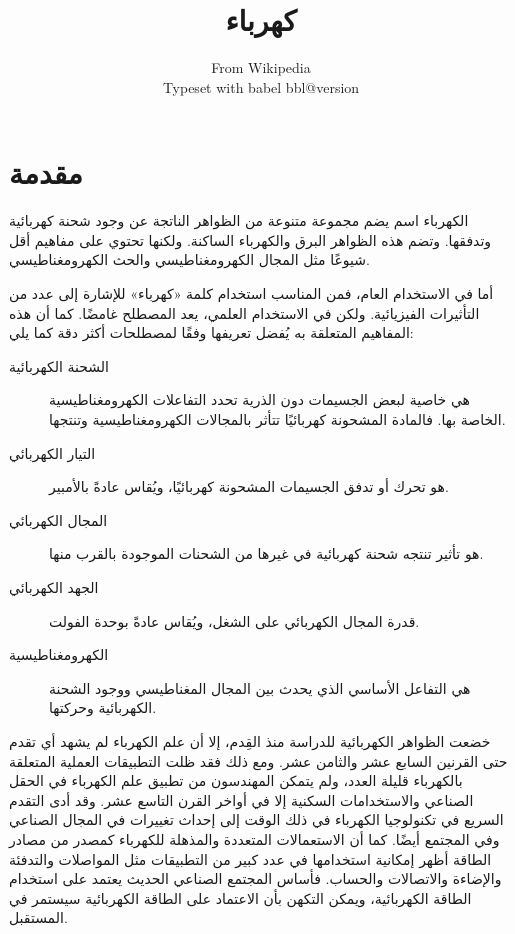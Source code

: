 \documentclass[a4paper]{book}
\title{كهرباء}
\author{\foreignlanguage{english}{From Wikipedia}\\%
        \foreignlanguage{english}{%
          Typeset with \textsf{babel} \csname bbl@version\endcsname}}
\begin{document}
\frontmatter

\maketitle

\tableofcontents

\chapter{مقدمة}

الكهرباء اسم يضم مجموعة متنوعة من الظواهر الناتجة عن وجود شحنة
كهربائية وتدفقها. وتضم هذه الظواهر البرق والكهرباء الساكنة. ولكنها
تحتوي على مفاهيم أقل شيوعًا مثل المجال الكهرومغناطيسي والحث
الكهرومغناطيسي.

أما في الاستخدام العام، فمن المناسب استخدام كلمة «كهرباء» للإشارة إلى
عدد من التأثيرات الفيزيائية. ولكن في الاستخدام العلمي، يعد المصطلح
غامضًا. كما أن هذه المفاهيم المتعلقة به يُفضل تعريفها وفقًا لمصطلحات أكثر
دقة كما يلي:

\begin{description}
\item[الشحنة الكهربائية] هي خاصية لبعض الجسيمات دون الذرية تحدد
التفاعلات الكهرومغناطيسية الخاصة بها. فالمادة المشحونة كهربائيًا تتأثر
بالمجالات الكهرومغناطيسية وتنتجها.
\item[التيار الكهربائي] هو تحرك أو تدفق الجسيمات المشحونة كهربائيًا،
ويُقاس عادةً بالأمبير.
\item[المجال الكهربائي] هو تأثير تنتجه شحنة كهربائية في غيرها من
الشحنات الموجودة بالقرب منها.
\item[الجهد الكهربائي] قدرة المجال الكهربائي على الشغل، ويُقاس عادةً
بوحدة الفولت.
\item[الكهرومغناطيسية] هي التفاعل الأساسي الذي يحدث بين المجال
المغناطيسي ووجود الشحنة الكهربائية وحركتها.
\end{description}

خضعت الظواهر الكهربائية للدراسة منذ القِدم، إلا أن علم الكهرباء لم يشهد
أي تقدم حتى القرنين السابع عشر والثامن عشر. ومع ذلك فقد ظلت التطبيقات
العملية المتعلقة بالكهرباء قليلة العدد، ولم يتمكن المهندسون من تطبيق
علم الكهرباء في الحقل الصناعي والاستخدامات السكنية إلا في أواخر القرن
التاسع عشر. وقد أدى التقدم السريع في تكنولوجيا الكهرباء في ذلك الوقت
إلى إحداث تغييرات في المجال الصناعي وفي المجتمع أيضًا. كما أن
الاستعمالات المتعددة والمذهلة للكهرباء كمصدر من مصادر الطاقة أظهر
إمكانية استخدامها في عدد كبير من التطبيقات مثل المواصلات والتدفئة
والإضاءة والاتصالات والحساب. فأساس المجتمع الصناعي الحديث يعتمد على
استخدام الطاقة الكهربائية، ويمكن التكهن بأن الاعتماد على الطاقة
الكهربائية سيستمر في المستقبل.
\end{document}
